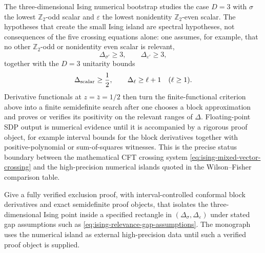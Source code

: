 The three-dimensional Ising numerical bootstrap studies the case \(D=3\)
with \(\sigma\) the lowest \(\mathbb Z_2\)-odd scalar and \(\varepsilon\) the
lowest nonidentity \(\mathbb Z_2\)-even scalar.  The hypotheses that create
the small Ising island are spectral hypotheses, not consequences of the five
crossing equations alone: one assumes, for example, that no other
\(\mathbb Z_2\)-odd or nonidentity even scalar is relevant,
\begin{equation}
  \Delta_{\sigma'}\ge3,\qquad \Delta_{\varepsilon'}\ge3,
  \label{eq:ising-relevance-gap-assumptions}
\end{equation}
together with the \(D=3\) unitarity bounds
\[
  \Delta_{\rm scalar}\ge\frac12,\qquad
  \Delta_\ell\ge \ell+1\quad(\ell\ge1).
\]
Derivative functionals at \(z=\bar z=1/2\) then turn the finite-functional
criterion above into a finite semidefinite search after one chooses a block
approximation and proves or verifies its positivity on the relevant ranges of
\(\Delta\).  Floating-point SDP output is numerical evidence until it is
accompanied by a rigorous proof object, for example interval bounds for the
block derivatives together with positive-polynomial or sum-of-squares
witnesses.  This is the precise
status boundary between the mathematical CFT crossing system
\eqref{eq:ising-mixed-vector-crossing} and the high-precision numerical
islands quoted in the Wilson--Fisher comparison table.

\begin{openproblem}
\label{op:interval-verified-mixed-correlator-ising-island}
Give a fully verified exclusion proof, with interval-controlled conformal
block derivatives and exact semidefinite proof objects, that isolates the
three-dimensional Ising point inside a specified rectangle in
\((\Delta_\sigma,\Delta_\varepsilon)\) under stated gap assumptions such as
\eqref{eq:ising-relevance-gap-assumptions}.  The monograph uses the
numerical island as external high-precision data until such a verified proof
object is supplied.
\end{openproblem}
